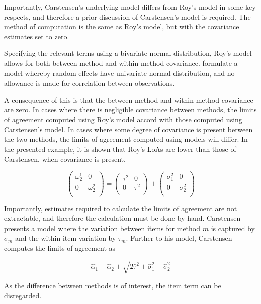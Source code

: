 \documentclass[12pt, a4paper]{report}
\theoremstyle{plain}
\theoremstyle{definition}
\theoremstyle{remark}
\begin{document}
Importantly, Carstensen's underlying model differs from Roy's model in some key respects, and therefore a prior discussion of Carstensen's model is required. The method of computation is the same as Roy's model, but with the covariance estimates set to zero.

Specifying the relevant terms using a bivariate normal distribution, Roy's model allows for both between-method and within-method covariance. \citet{BXC2008} formulate a model whereby random effects have univariate normal distribution, and no allowance is made for correlation between observations.

A consequence of this is that the between-method and within-method covariance are zero. In cases where there is negligible covariance between methods, the limits of agreement computed using Roy's model accord with those computed using Carstensen's model. In cases where some degree of covariance is present between the two methods, the limits of agreement computed using models will differ. In the presented example, it is shown that Roy's LoAs are lower than those of Carstensen, when covariance is present. 

\[\left(\begin{array}{cc}
\omega^1_2  & 0 \\
0 & \omega^2_2 \\
\end{array}  \right)
=  \left(
\begin{array}{cc}
\tau^2  & 0 \\
0 & \tau^2 \\
\end{array} \right)+
\left(
\begin{array}{cc}
\sigma^2_1  & 0 \\
0 & \sigma^2_2 \\
\end{array}\right)
\]

Importantly, estimates required to calculate the limits of agreement are not extractable, and therefore the calculation must be done by hand. Carstensen presents a model where the variation between items for method $m$ is captured by $\sigma_m$ and the within item variation by $\tau_m$. Further to his model, Carstensen computes the limits of agreement
as

\[
\hat{\alpha}_1 - \hat{\alpha}_2 \pm \sqrt{2 \hat{\tau}^2 +
	\hat{\sigma}^2_1 + \hat{\sigma}^2_2}
\]

As the difference between methods is of interest, the item term can be disregarded.
\end{document}
